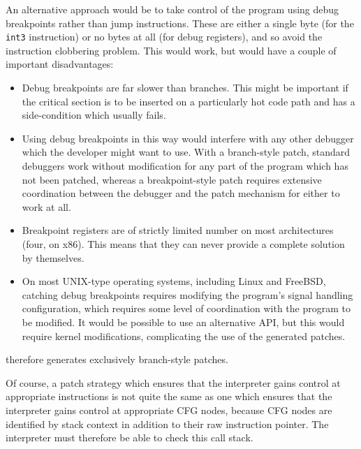 An alternative approach would be to take control of the program using
debug breakpoints rather than jump instructions.  These are either a
single byte (for the \verb|int3| instruction) or no bytes at all (for
debug registers), and so avoid the instruction clobbering problem.
This would work, but would have a couple of important disadvantages:

\begin{itemize}
\item
  Debug breakpoints are far slower than branches.  This might be
  important if the critical section is to be inserted on
  a particularly hot code path and has a side-condition which usually
  fails.
\item
  Using debug breakpoints in this way would interfere with any other
  debugger which the developer might want to use.  With a branch-style
  patch, standard debuggers work without modification for any part of
  the program which has not been patched, whereas a breakpoint-style
  patch requires extensive coordination between the debugger and the
  patch mechanism for either to work at all.
\item
  Breakpoint registers are of strictly limited number on most
  architectures (four, on x86).  This means that they can never
  provide a complete solution by themselves.
\item
  On most UNIX-type operating systems, including Linux and FreeBSD,
  catching debug breakpoints requires modifying the program's signal
  handling configuration, which requires some level of coordination
  with the program to be modified.  It would be possible to use an
  alternative API, but this would require kernel modifications,
  complicating the use of the generated patches.
\end{itemize}

{\Implementation} therefore generates exclusively branch-style patches.



Of course, a patch strategy which ensures that the interpreter gains
control at appropriate instructions is not quite the same as one which
ensures that the interpreter gains control at appropriate CFG nodes,
because {\technique} CFG nodes are identified by stack context in
addition to their raw instruction pointer.  The interpreter must
therefore be able to check this call stack.  

